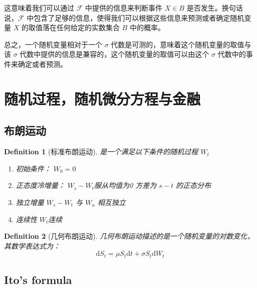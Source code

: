 \documentclass{article}
\newtheorem{definition}{Definition}
\begin{document}
这意味着我们可以通过 $\mathcal{F}$ 中提供的信息来判断事件 ${X \in B}$ 是否发生。换句话说，$\mathcal{F}$ 中包含了足够的信息，使得我们可以根据这些信息来预测或者确定随机变量 $X$ 的取值落在任何给定的实数集合 $B$ 中的概率。

总之，一个随机变量相对于一个 $\sigma$ 代数是可测的，意味着这个随机变量的取值与该 $\sigma$ 代数中提供的信息是兼容的，这个随机变量的取值可以由这个 $\sigma$ 代数中的事件来确定或者预测。

\newpage






\section{随机过程，随机微分方程与金融}
\subsection{布朗运动}

\begin{definition}[标准布朗运动]
    是一个满足以下条件的随机过程 $ W_t $
    \begin{enumerate}
        \item 初始条件： $ W_0=0 $
        \item 正态度冷增量： $ W_s-W_t $服从均值为0 方差为 $ s-t $ 的正态分布
        \item 独立增量  $ W_s-W_t $ 与 $ W_u $  相互独立
        \item 连续性 $ W_t $连续
    \end{enumerate}

\end{definition}


\begin{definition}[几何布朗运动]
    几何布朗运动描述的是一个随机变量的对数变化，其数学表达式为：
        \[ \mathrm{d}S_t=\mu S_t \mathrm{d}t+\sigma S_t \mathrm{d}W_t \]
\end{definition}


\subsection{Ito’s formula}
\end{document}
